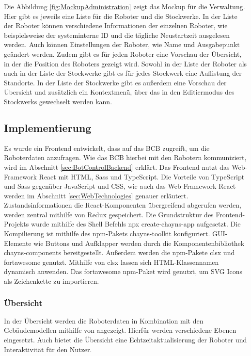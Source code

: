 Die Abbildung \ref{fig:MockupAdministration} zeigt das Mockup für die Verwaltung. Hier gibt es jeweils eine Liste für die Roboter und die Stockwerke. In der Liste der Roboter können verschiedene Informationen der einzelnen Roboter, wie beispielsweise der systeminterne \ac{ID} und die tägliche Neustartzeit ausgelesen werden. Auch können Einstellungen der Roboter, wie Name und Ausgabepunkt geändert werden. Zudem gibt es für jeden Roboter eine Vorschau der Übersicht, in der die Position des Roboters gezeigt wird. Sowohl in der Liste der Roboter als auch in der Liste der Stockwerke gibt es für jedes Stockwerk eine Auflistung der Standorte. In der Liste der Stockwerke gibt es außerdem eine Vorschau der Übersicht und zusätzlich ein Kontextmenü, über das in den Editiermodus des Stockwerks gewechselt werden kann.

\subsection{Implementierung}
Es wurde ein Frontend entwickelt, dass auf das \ac{BCB} zugreift, um die Roboterdaten anzufragen. Wie das \ac{BCB} hierbei mit den Robotern kommuniziert, wird im Abschnitt \ref{sec:BotControlBackend} erklärt. Das Frontend nutzt das Web-Framework React mit \ac{HTML}, \ac{Sass} und TypeScript. Die Vorteile von TypeScript und \ac{Sass} gegenüber JavaScript und \ac{CSS}, wie auch das Web-Framework React werden im Abschnitt \ref{sec:WebTechnologies} genauer erläutert. Zustandsinformationen die React-Komponenten übergreifend abgerufen werden, werden zentral mithilfe von Redux gespeichert. Die Grundstruktur des Frontend-Projekts wurde mithilfe des Shell Befehls npx create-chayns-app \cite{CreateChaynsApp} aufgesetzt. Die Kompilierung ist mithilfe des \ac{npm}-Pakets chayns-toolkit \cite{ChaynsToolkit} konfiguriert. \ac{GUI}-Elemente wie Buttons und Aufklapper werden durch die Komponentenbibliothek chayns-components \cite{ChaynsComponents} bereitgestellt. Außerdem werden die \ac{npm}-Pakete clsx \cite{clsx} und fortawesome \cite{fontawesome} genutzt. Mithilfe von clsx lassen sich \ac{HTML}-Klassennamen dynamisch anwenden. Das fortawesome \ac{npm}-Paket wird genutzt, um \ac{SVG} Icons als Zeichenkette zu importieren.

\subsubsection{Übersicht}
In der Übersicht werden die Roboterdaten in Kombination mit den Gebäudemodellen mithilfe von \deckgl{} angezeigt. Hierfür werden verschiedene Ebenen eingesetzt. Auch bietet die Übersicht eine Echtzeitaktualisierung der Roboter und Interaktivität für den Nutzer.

